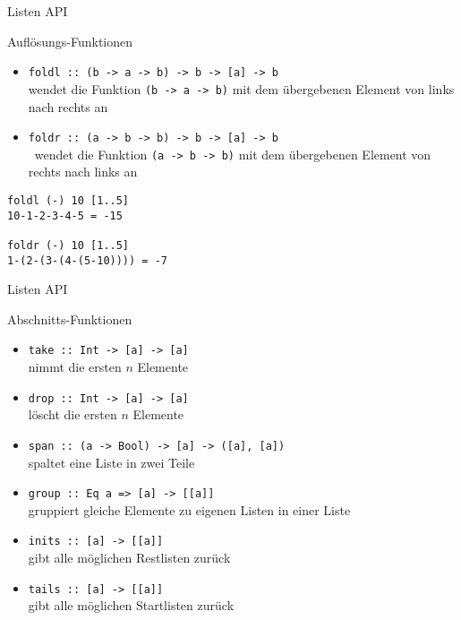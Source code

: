 \documentclass[fleqn,11pt,aspectratio=43]{beamer}
\begin{document}
\begin{frame}[fragile]{Listen API}
\begin{block}{Auflösungs-Funktionen}
\begin{itemize}
\item \lstinline|foldl :: (b -> a -> b) -> b -> [a] -> b| \\ wendet die Funktion \lstinline|(b -> a -> b)| mit dem übergebenen Element von links nach rechts an
\item \lstinline|foldr :: (a -> b -> b) -> b -> [a] -> b| \\ wendet die Funktion \lstinline|(a -> b -> b)| mit dem übergebenen Element von rechts nach links an
\end{itemize}
\end{block}
\begin{lstlisting}
foldl (-) 10 [1..5]
10-1-2-3-4-5 = -15

foldr (-) 10 [1..5]
1-(2-(3-(4-(5-10)))) = -7
\end{lstlisting}
\end{frame}

\begin{frame}[fragile]{Listen API}
\begin{block}{Abschnitts-Funktionen}
\begin{itemize}
\item \lstinline|take :: Int -> [a] -> [a]| \\ nimmt die ersten $n$ Elemente
\item \lstinline|drop :: Int -> [a] -> [a]| \\ löscht die ersten $n$ Elemente
\item \lstinline|span :: (a -> Bool) -> [a] -> ([a], [a])| \\ spaltet eine Liste in zwei Teile
\item \lstinline|group :: Eq a => [a] -> [[a]]| \\ gruppiert gleiche Elemente zu eigenen Listen in einer Liste
\item \lstinline|inits :: [a] -> [[a]]| \\ gibt alle möglichen Restlisten zurück
\item \lstinline|tails :: [a] -> [[a]]| \\ gibt alle möglichen Startlisten zurück
\end{itemize}
\end{block}
\end{frame}
\end{document}
